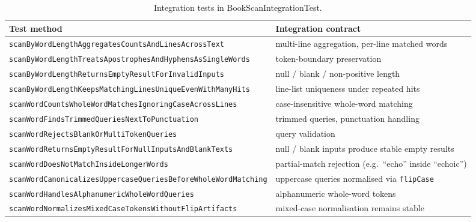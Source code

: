 \documentclass[journal]{IEEEtran}
\begin{document}
\begin{table}[!t]
\renewcommand{\arraystretch}{1.15}
\caption{Integration tests in BookScanIntegrationTest.}
\label{tab:int-tests}
\centering
\footnotesize
\begin{tabular}{@{}p{6.0cm}p{10.0cm}@{}}
\toprule
\textbf{Test method} & \textbf{Integration contract} \\
\midrule
\texttt{scanByWordLengthAggregates}\-\texttt{CountsAndLinesAcrossText} & multi-line aggregation, per-line matched words \\
\texttt{scanByWordLengthTreats}\-\texttt{ApostrophesAndHyphensAs}\-\texttt{SingleWords} & token-boundary preservation \\
\texttt{scanByWordLengthReturns}\-\texttt{EmptyResultForInvalidInputs} & null / blank / non-positive length \\
\texttt{scanByWordLengthKeeps}\-\texttt{MatchingLinesUniqueEvenWith}\-\texttt{ManyHits} & line-list uniqueness under repeated hits \\
\texttt{scanWordCountsWholeWord}\-\texttt{MatchesIgnoringCaseAcrossLines} & case-insensitive whole-word matching \\
\texttt{scanWordFindsTrimmed}\-\texttt{QueriesNextToPunctuation} & trimmed queries, punctuation handling \\
\texttt{scanWordRejectsBlankOr}\-\texttt{MultiTokenQueries} & query validation \\
\texttt{scanWordReturnsEmpty}\-\texttt{ResultForNullInputsAnd}\-\texttt{BlankTexts} & null / blank inputs produce stable empty results \\
\texttt{scanWordDoesNotMatch}\-\texttt{InsideLongerWords} & partial-match rejection (e.g.\ ``echo'' inside ``echoic'') \\
\texttt{scanWordCanonicalizes}\-\texttt{UppercaseQueriesBefore}\-\texttt{WholeWordMatching} & uppercase queries normalised via \texttt{flipCase} \\
\texttt{scanWordHandlesAlphanumeric}\-\texttt{WholeWordQueries} & alphanumeric whole-word tokens \\
\texttt{scanWordNormalizesMixed}\-\texttt{CaseTokensWithoutFlipArtifacts} & mixed-case normalisation remains stable \\
\bottomrule
\end{tabular}
\end{table}
\end{document}
